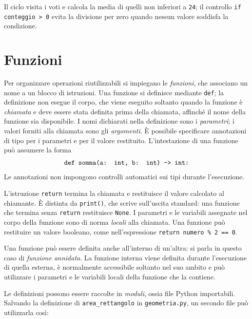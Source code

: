 

Il ciclo visita i voti e calcola la media di quelli non inferiori a
\texttt{24}; il controllo \texttt{if conteggio > 0} evita la divisione
per zero quando nessun valore soddisfa la condizione.

\section{Funzioni}
\label{sec:fi-python-funzioni}

Per organizzare operazioni riutilizzabili si impiegano le \emph{funzioni},
che associano un nome a un blocco di istruzioni. Una funzione si definisce
mediante \texttt{def}; la definizione non esegue il corpo, che viene
eseguito soltanto quando la funzione è \emph{chiamata} e deve essere
stata definita prima della chiamata, affinché il nome della
funzione sia disponibile. I nomi dichiarati nella definizione sono i
\emph{parametri}; i valori forniti alla chiamata
sono gli \emph{argomenti}. È possibile specificare annotazioni di tipo per
i parametri e per il valore restituito. L'intestazione di una funzione può
assumere la forma
\[
  \text{\texttt{def somma(a: int, b: int) -> int:}}
\]
Le annotazioni non impongono controlli automatici sui tipi durante
l'esecuzione.



L'istruzione \texttt{return} termina la chiamata e restituisce il
valore calcolato al chiamante. È distinta da \texttt{print()}, che
scrive sull'uscita standard: una funzione che termina senza
\texttt{return} restituisce \texttt{None}. I parametri e le variabili
assegnate nel corpo della funzione sono di norma \emph{locali} alla
chiamata. Una funzione può restituire un valore booleano, come
nell'espressione \texttt{return numero \% 2 == 0}.

Una funzione può essere definita anche all'interno di un'altra:
si parla in questo caso di \emph{funzione annidata}. La funzione
interna viene definita durante l'esecuzione di quella esterna,
è normalmente accessibile soltanto nel suo ambito e può utilizzare
i parametri e le variabili locali della funzione che la contiene.

Le definizioni possono essere raccolte in \emph{moduli}, ossia file
Python importabili. Salvando la definizione di
\texttt{area\_rettangolo} in \texttt{geometria.py}, un secondo file
può utilizzarla così:



